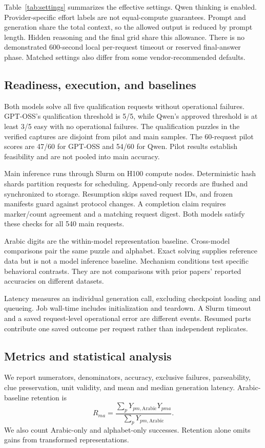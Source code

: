 \documentclass[11pt]{article}
\begin{document}
Table~\ref{tab:settings} summarizes the effective settings. Qwen thinking is enabled. Provider-specific effort labels are not equal-compute guarantees. Prompt and generation share the total context, so the allowed output is reduced by prompt length. Hidden reasoning and the final grid share this allowance. There is no demonstrated 600-second local per-request timeout or reserved final-answer phase. Matched settings also differ from some vendor-recommended defaults.

\subsection{Readiness, execution, and baselines}
Both models solve all five qualification requests without operational failures. GPT-OSS's qualification threshold is 5/5, while Qwen's approved threshold is at least 3/5 easy with no operational failures. The qualification puzzles in the verified captures are disjoint from pilot and main samples. The 60-request pilot scores are 47/60 for GPT-OSS and 54/60 for Qwen. Pilot results establish feasibility and are not pooled into main accuracy.

Main inference runs through Slurm on H100 compute nodes. Deterministic hash shards partition requests for scheduling. Append-only records are flushed and synchronized to storage. Resumption skips saved request IDs, and frozen manifests guard against protocol changes. A completion claim requires marker/count agreement and a matching request digest. Both models satisfy these checks for all 540 main requests.

Arabic digits are the within-model representation baseline. Cross-model comparisons pair the same puzzle and alphabet. Exact solving supplies reference data but is not a model inference baseline. Mechanism conditions test specific behavioral contrasts. They are not comparisons with prior papers' reported accuracies on different datasets.

Latency measures an individual generation call, excluding checkpoint loading and queueing. Job wall-time includes initialization and teardown. A Slurm timeout and a saved request-level operational error are different events. Resumed parts contribute one saved outcome per request rather than independent replicates.

\subsection{Metrics and statistical analysis}
We report numerators, denominators, accuracy, exclusive failures, parseability, clue preservation, unit validity, and mean and median generation latency. Arabic-baseline retention is
\begin{equation}
 R_{ma}=\frac{\sum_p Y_{pm,\mathrm{Arabic}}Y_{pma}}
 {\sum_p Y_{pm,\mathrm{Arabic}}}.
\end{equation}
We also count Arabic-only and alphabet-only successes. Retention alone omits gains from transformed representations.
\end{document}
